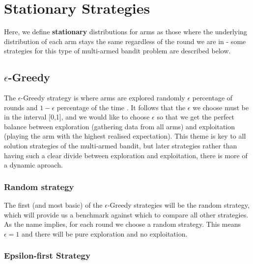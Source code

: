 \section{Stationary Strategies}\label{sec:stationary-strategies}
Here, we define \textbf{stationary} distributions for arms as those where the underlying distribution of each arm stays the same regardless of the round we are in - some strategies for this type of multi-armed bandit problem are described below.

\subsection{$\epsilon$-Greedy}\label{subsec: $epsilon$-greedy}
    The $\epsilon$-Greedy strategy is where arms are explored randomly $\epsilon$ percentage of rounds and $1-\epsilon$ percentage of the time \citep{DBLP:journals/corr/abs-1807-09809}.
    It follows that the $\epsilon$ we choose must be in the interval [0,1], and we would like to choose $\epsilon$ so that we get the perfect balance between exploration (gathering data from all arms) and exploitation (playing the arm with the highest realised expectation).
    This theme is key to all solution strategies of the multi-armed bandit, but later strategies rather than having such a clear divide between exploration and exploitation, there is more of a dynamic aproach.

    \subsubsection{Random strategy}
    The first (and most basic) of the $\epsilon$-Greedy strategies will be the random strategy, which will provide us a benchmark against which to compare all other strategies.
    As the name implies, for each round we choose a random strategy.
    This means $\epsilon=1$ and there will be pure exploration and no exploitation.

    \subsubsection{Epsilon-first Strategy}

